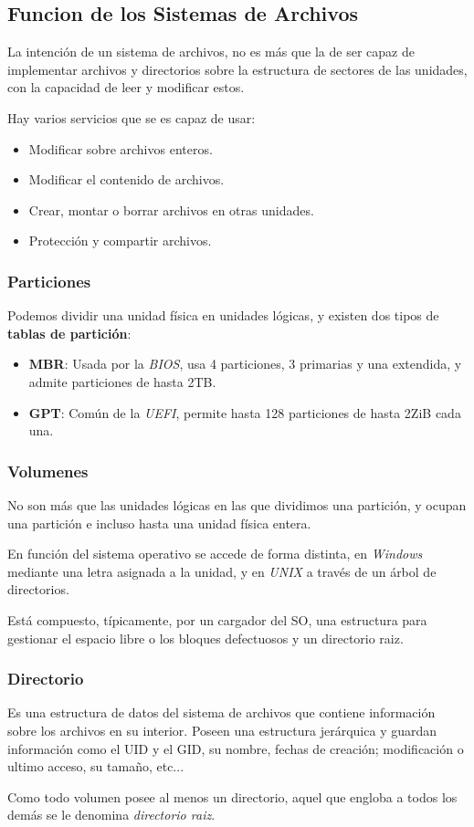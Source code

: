 \subsection{Funcion de los Sistemas de Archivos}
La intención de un sistema de archivos, no es más que la de ser capaz de implementar archivos y directorios sobre la estructura de sectores de las unidades, con la capacidad de leer y modificar estos.
\par  Hay varios servicios que se es capaz de usar:
\begin{itemize}
        \item Modificar sobre archivos enteros.
        \item Modificar el contenido de archivos.
        \item Crear, montar o borrar archivos en otras unidades.
        \item Protección y compartir archivos.
\end{itemize}
\subsubsection{Particiones}
Podemos dividir una unidad física en unidades lógicas, y existen dos tipos de \textbf{tablas de partición}:
\begin{itemize}
        \item \textbf{MBR}: Usada por la \textit{BIOS}, usa 4 particiones, 3 primarias y una extendida, y admite particiones de hasta 2TB.
        \item \textbf{GPT}: Común de la \textit{UEFI}, permite hasta 128 particiones de hasta 2ZiB cada una.
\end{itemize}
\subsubsection{Volumenes}
No son más que las unidades lógicas en las que dividimos una partición, y ocupan una partición e incluso hasta una unidad física entera. \par  En función del sistema operativo se accede de forma distinta, en \textit{Windows} mediante una letra asignada a la unidad, y en \textit{UNIX} a través de un árbol de directorios.
\par  Está compuesto, típicamente, por un cargador del SO, una estructura para gestionar el espacio libre o los bloques defectuosos y un directorio raiz.
\subsubsection{Directorio}
Es una estructura de datos del sistema de archivos que contiene información sobre los archivos en su interior. Poseen una estructura jerárquica y guardan información como el UID y el GID, su nombre, fechas de creación; modificación o ultimo acceso, su tamaño, etc...
\par  Como todo volumen posee al menos un directorio, aquel que engloba a todos los demás se le denomina \textit{directorio raiz}.
